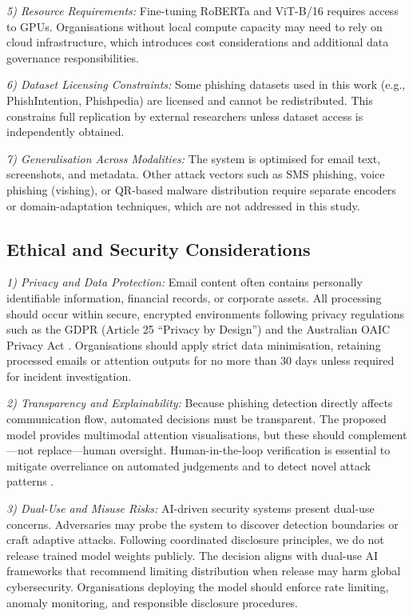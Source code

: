 \documentclass[conference]{IEEEtran}
\begin{document}
\textit{5) Resource Requirements:} Fine-tuning RoBERTa and ViT-B/16 requires access to GPUs. Organisations without local compute capacity may need to rely on cloud infrastructure, which introduces cost considerations and additional data governance responsibilities.

\textit{6) Dataset Licensing Constraints:} Some phishing datasets used in this work (e.g., PhishIntention, Phishpedia) are licensed and cannot be redistributed. This constrains full replication by external researchers unless dataset access is independently obtained.

\textit{7) Generalisation Across Modalities:} The system is optimised for email text, screenshots, and metadata. Other attack vectors such as SMS phishing, voice phishing (vishing), or QR-based malware distribution require separate encoders or domain-adaptation techniques, which are not addressed in this study.

\subsection{Ethical and Security Considerations}

\textit{1) Privacy and Data Protection:} Email content often contains personally identifiable information, financial records, or corporate assets. All processing should occur within secure, encrypted environments following privacy regulations such as the GDPR (Article 25 ``Privacy by Design'') and the Australian OAIC Privacy Act \cite{dwork_2014_dp}. Organisations should apply strict data minimisation, retaining processed emails or attention outputs for no more than 30 days unless required for incident investigation.

\textit{2) Transparency and Explainability:} Because phishing detection directly affects communication flow, automated decisions must be transparent. The proposed model provides multimodal attention visualisations, but these should complement---not replace---human oversight. Human-in-the-loop verification is essential to mitigate overreliance on automated judgements and to detect novel attack patterns \cite{ribeiro_2016_lime}.

\textit{3) Dual-Use and Misuse Risks:} AI-driven security systems present dual-use concerns. Adversaries may probe the system to discover detection boundaries or craft adaptive attacks. Following coordinated disclosure principles, we do not release trained model weights publicly. The decision aligns with dual-use AI frameworks that recommend limiting distribution when release may harm global cybersecurity. Organisations deploying the model should enforce rate limiting, anomaly monitoring, and responsible disclosure procedures.
\end{document}
